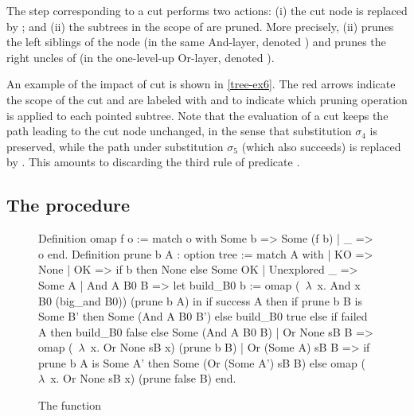 The step corresponding to a cut performs two actions: (i) the cut node is
replaced by \okC; and (ii) the subtrees in the scope of \cutC are pruned. More
precisely, (ii) prunes the left siblings of the \cutC node (in the same
And-layer, denoted \cutl) and prunes the right uncles of \cutC (in the
one-level-up Or-layer, denoted \cutr).




An example of the impact of cut is shown in \cref{tree-ex6}.
The red arrows
indicate the scope of the cut and are labeled with \cutr and \cutl to indicate
which pruning operation is applied to each pointed subtree. Note that
the evaluation of a cut keeps the path leading to the cut node unchanged, in
the sense that substitution $\sigma_4$ is preserved, while the path under
substitution $\sigma_5$ (which also succeeds) is replaced by \koC. This
amounts to discarding the third rule of predicate .

\subsection{The \na procedure}\label{sec:next_alt}
\label{sec:na}

\begin{figure}
  \begin{coqcode}
  Definition omap f o := match o with Some b => Some (f b) | _ => o end.
  Definition prune b A : option tree :=
    match A with
    | KO => None
    | OK => if b then None else Some OK
    | Unexplored _ => Some A
    | And A B0 B =>
        let build_B0 b := omap (~$\lambda$~x. And x B0 (big_and B0)) (prune b A) in
        if success A then
          if prune b B is Some B' then Some (And A B0 B')
          else build_B0 true
        else if failed A then build_B0 false
        else Some (And A B0 B)
    | Or None sB B => omap (~$\lambda$~x. Or None sB x) (prune b B)
    | Or (Some A) sB B =>
        if prune b A is Some A' then Some (Or (Some A') sB B)
        else omap (~$\lambda$~x. Or None sB x) (prune false B)
  end.
  \end{coqcode}
  \caption{The \na function}
\end{figure}

